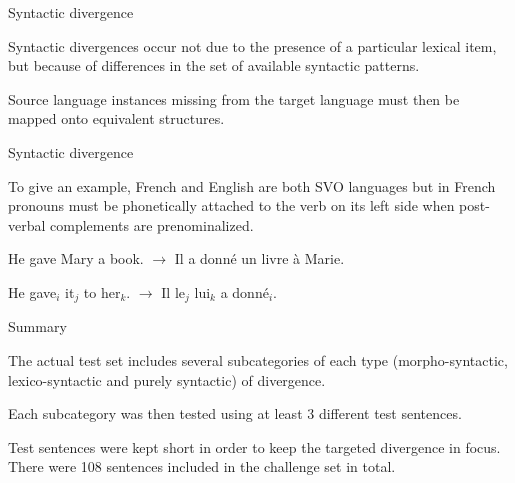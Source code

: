 \documentclass{beamer}
\begin{document}
\begin{frame}{Syntactic divergence}

  Syntactic divergences occur not due to the presence of a particular lexical item, but because of differences in the set of available syntactic patterns.

  \medskip

  Source language instances missing from the target language must then be mapped onto equivalent structures.

\end{frame}


\begin{frame}{Syntactic divergence}

  To give an example, French and English are both SVO languages but in French pronouns must be phonetically attached to the verb on its left side when post-verbal complements are prenominalized.

  \medskip

  He gave Mary a book. $\rightarrow$ Il a donn\'e un livre \`a Marie.

  He gave$_i$ it$_j$ to her$_k$. $\rightarrow$ Il le$_j$ lui$_k$ a donn\'e$_i$.

\end{frame}

\begin{frame}{Summary}

  The actual test set includes several subcategories of each type (morpho-syntactic, lexico-syntactic and purely syntactic) of divergence.

  \medskip

  Each subcategory was then tested using at least 3 different test sentences.

  \medskip

  Test sentences were kept short in order to keep the targeted divergence in focus. There were 108 sentences included in the challenge set in total.

\end{frame}
\end{document}
